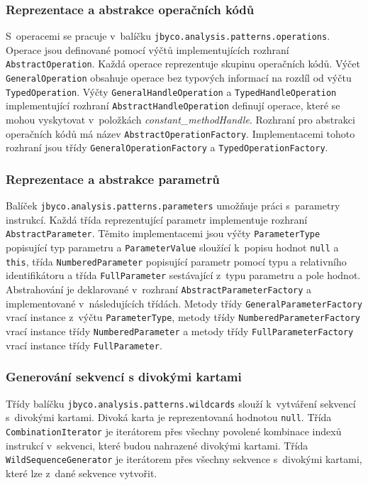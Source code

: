 \subsubsection{Reprezentace a abstrakce operačních kódů}

S~operacemi se pracuje v~balíčku \texttt{jbyco.analysis.patterns.operations}. Operace jsou definované pomocí výčtů implementujících rozhraní \texttt{AbstractOperation}. Každá operace reprezentuje skupinu operačních kódů. Výčet \texttt{GeneralOperation} obsahuje operace bez typových informací na rozdíl od výčtu \texttt{TypedOperation}. Výčty \texttt{GeneralHandleOperation} a \texttt{TypedHandleOperation} implementující rozhraní \texttt{AbstractHandleOperation} definují operace, které se mohou vyskytovat v~položkách \textit{constant\_methodHandle}. Rozhraní pro abstrakci operačních kódů má název \texttt{AbstractOperationFactory}. Implementacemi tohoto rozhraní jsou třídy \texttt{GeneralOperationFactory} a \texttt{TypedOperationFactory}. 

\subsubsection{Reprezentace a abstrakce parametrů}

Balíček \texttt{jbyco.analysis.patterns.parameters} umožňuje práci s~parametry instrukcí. Každá třída reprezentující parametr implementuje rozhraní \texttt{AbstractParameter}. Těmito implementacemi jsou výčty \texttt{ParameterType} popisující typ parametru a \texttt{ParameterValue} sloužící k~popisu hodnot \texttt{null} a \texttt{this}, třída \texttt{NumberedParameter} popisující parametr pomocí typu a relativního identifikátoru a třída \texttt{FullParameter} sestávající z~typu parametru a pole hodnot. Abstrahování je deklarované v~rozhraní \texttt{AbstractParameterFactory} a implementované v~následujících třídách. Metody třídy \texttt{GeneralParameterFactory} vrací instance z~výčtu \texttt{ParameterType}, metody třídy \texttt{NumberedParameterFactory} vrací instance třídy \texttt{NumberedParameter} a metody třídy \texttt{FullParameterFactory} vrací instance třídy \texttt{FullParameter}.

\subsubsection{Generování sekvencí s divokými kartami}

Třídy balíčku \texttt{jbyco.analysis.patterns.wildcards} slouží k~vytváření sekvencí s~divokými kartami. Divoká karta je reprezentovaná hodnotou \texttt{null}. Třída \texttt{CombinationIterator} je iterátorem přes všechny povolené kombinace indexů instrukcí v~sekvenci, které budou nahrazené divokými kartami. Třída \texttt{WildSequenceGenerator} je iterátorem přes všechny sekvence s~divokými kartami, které lze z~dané sekvence vytvořit.

